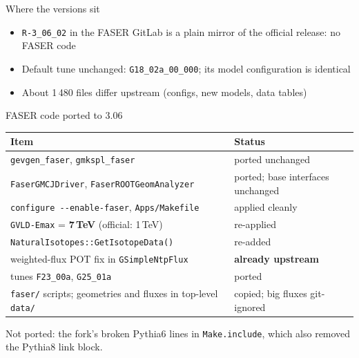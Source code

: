 \documentclass[10pt,aspectratio=169]{beamer}
\newcommand{\code}[1]{\texttt{\small #1}}
\begin{document}
\begin{frame}{Where the versions sit}
  \centering
  \vspace{1em}
  \begin{itemize}
    \item \code{R-3\_06\_02} in the FASER GitLab is a plain mirror of the official release:
          \alert{no FASER code}
    \item Default tune unchanged: \code{G18\_02a\_00\_000}; its model configuration is identical
    \item About 1\,480 files differ upstream (configs, new models, data tables)
  \end{itemize}
\end{frame}

\begin{frame}{FASER code ported to 3.06}
  \footnotesize
  \begin{tabular}{@{}L{0.5\textwidth}L{0.43\textwidth}@{}}
    \toprule
    Item & Status \\
    \midrule
    \code{gevgen\_faser}, \code{gmkspl\_faser} & ported unchanged \\
    \code{FaserGMCJDriver}, \code{FaserROOTGeomAnalyzer} & ported; base interfaces unchanged \\
    \code{configure -{}-enable-faser}, \code{Apps/Makefile} & applied cleanly \\
    \code{GVLD-Emax} = \textbf{7\,TeV} (official: 1\,TeV) & re-applied \\
    \code{NaturalIsotopes::GetIsotopeData()} & re-added \\
    weighted-flux POT fix in \code{GSimpleNtpFlux} & \textbf{already upstream} \\
    tunes \code{F23\_00a}, \code{G25\_01a} & ported \\
    \code{faser/} scripts; geometries and fluxes in top-level \code{data/} & copied; big fluxes git-ignored \\
    \bottomrule
  \end{tabular}
  \vspace{0.6em}

  \small Not ported: the fork's broken Pythia6 lines in \code{Make.include}, which also removed the Pythia8 link block.
\end{frame}
\end{document}
